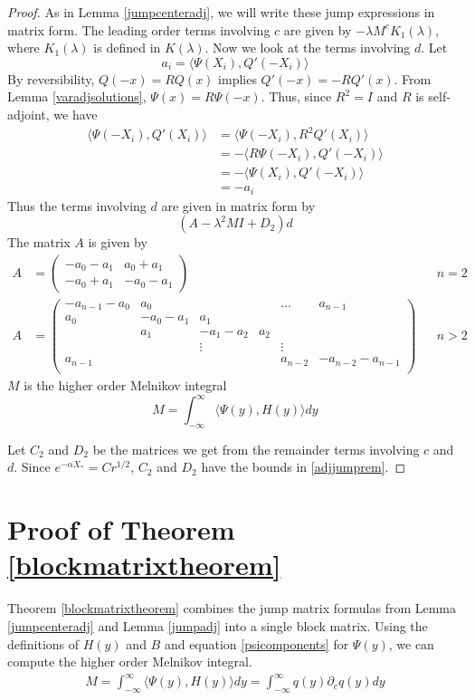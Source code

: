 \documentclass[thesis.tex]{subfiles}
\begin{document}
\begin{lemma}
\begin{proof}
As in Lemma \ref{jumpcenteradj}, we will write these jump expressions in matrix form. The leading order terms involving $c$ are given by $-\lambda M^c K_1(\lambda)$, where $K_1(\lambda)$ is defined in $K(\lambda)$. Now we look at the terms involving $d$. Let
\[
a_i = \langle \Psi(X_i), Q'(-X_i) \rangle 
\]
By reversibility, $Q(-x) = R Q(x)$ implies $Q'(-x) = -R Q'(x)$. From Lemma \ref{varadjsolutions}, $\Psi(x) = R \Psi(-x)$. Thus, since $R^2 = I$ and $R$ is self-adjoint, we have
\begin{align*}
\langle \Psi(-X_i), Q'(X_i) \rangle &= \langle \Psi(-X_i), R^2 Q'(X_i) \rangle \\
&= -\langle R \Psi(-X_i), Q'(-X_i) \rangle \\
&= -\langle \Psi(X_i), Q'(-X_i) \rangle \\
&= -a_i
\end{align*}
Thus the terms involving $d$ are given in matrix form by
\[
(A - \lambda^2 M I + D_2)d
\]
The matrix $A$ is given by
\begin{align*}
A &= \begin{pmatrix}
-a_0 -a_1 & a_0 + a_1 \\
-a_0 + a_1 & -a_0 - a_1
\end{pmatrix} && n = 2 \\
A &= \begin{pmatrix}
-a_{n-1} - a_0 & a_0 & & & \dots & a_{n-1}\\
a_0 & -a_0 - a_1 &  a_1 \\
& a_1 & -a_1 - a_2 &  a_2 \\
& & \vdots & & \vdots \\
a_{n-1} & & & & a_{n-2} & -a_{n-2} - a_{n-1} \\
\end{pmatrix} && n > 2
\end{align*}
$M$ is the higher order Melnikov integral
\[
M = \int_{-\infty}^\infty \langle \Psi(y), H(y) \rangle dy
\]

Let $C_2$ and $D_2$ be the matrices we get from the remainder terms involving $c$ and $d$. Since $e^{-\alpha X_*} = C r^{1/2}$, $C_2$ and $D_2$ have the bounds in \cref{adjjumprem}.
\end{proof}
\end{lemma}

\section{Proof of Theorem \ref{blockmatrixtheorem}}

Theorem \ref{blockmatrixtheorem} combines the jump matrix formulas from Lemma \ref{jumpcenteradj} and Lemma \ref{jumpadj} into a single block matrix. Using the definitions of $H(y)$ and $B$ and equation \cref{psicomponents} for $\Psi(y)$, we can compute the higher order Melnikov integral.
\begin{align*}
M = \int_{-\infty}^\infty \langle \Psi(y), H(y) \rangle dy = \int_{-\infty}^\infty q(y) \partial_c q(y) dy
\end{align*}
\end{document}
